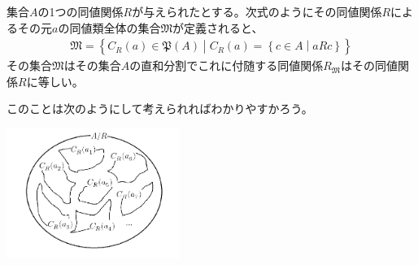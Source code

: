 \documentclass[dvipdfmx]{jsarticle}
\begin{document}
\begin{thm}\label{1.2.5.11}
集合$A$の1つの同値関係$R$が与えられたとする。次式のようにその同値関係$R$によるその元$a$の同値類全体の集合$\mathfrak{M}$が定義されると、
\begin{align*}
\mathfrak{M}=\left\{ C_{R}(a)\in \mathfrak{P}(A) \middle| C_{R}(a) = \left\{ c \in A \middle| aRc \right\} \right\}
\end{align*}
その集合$\mathfrak{M}$はその集合$A$の直和分割でこれに付随する同値関係$R_{\mathfrak{M}}$はその同値関係$R$に等しい。
\end{thm}\par
このことは次のようにして考えられればわかりやすかろう。
\begin{center}
  \includegraphics[width=160pt]{1.2.5.c.png}
\end{center}
\end{document}
